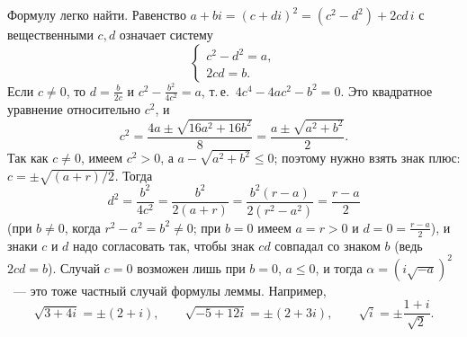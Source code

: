 Формулу легко найти. Равенство $a+bi=(c+di)^2=(c^2-d^2)+2cd\,i$ с вещественными $c,d$ означает систему
\[
\begin{cases}c^2-d^2=a,\\ 2cd=b.\end{cases}
\]
Если $c\ne0$, то $d=\frac b{2c}$ и $c^2-\frac{b^2}{4c^2}=a$, т.\,е.\ $4c^4-4ac^2-b^2=0$. Это квадратное уравнение
относительно $c^2$, и
\[
c^2=\frac{4a\pm\sqrt{16a^2+16b^2}}8=\frac{a\pm\sqrt{a^2+b^2}}2 .
\]
Так как $c\ne0$, имеем $c^2>0$, а $a-\sqrt{a^2+b^2}\le0$; поэтому нужно взять знак плюс: $c=\pm\sqrt{(a+r)/2}$. Тогда
\[
d^2=\frac{b^2}{4c^2}=\frac{b^2}{2(a+r)}=\frac{b^2(r-a)}{2(r^2-a^2)}=\frac{r-a}2
\]
(при $b\ne0$, когда $r^2-a^2=b^2\ne0$; при $b=0$ имеем $a=r>0$ и $d=0=\frac{r-a}2$), и знаки $c$ и $d$ надо согласовать так, чтобы знак $cd$ совпадал со знаком $b$ (ведь $2cd=b$). Случай $c=0$ возможен
лишь при $b=0$, $a\le0$, и тогда $\alpha=(i\sqrt{-a})^2$~--- это тоже частный случай формулы леммы. Например,
\[
\sqrt{3+4i}=\pm(2+i),\qquad \sqrt{-5+12i}=\pm(2+3i),\qquad \sqrt i=\pm\frac{1+i}{\sqrt2}.
\]

